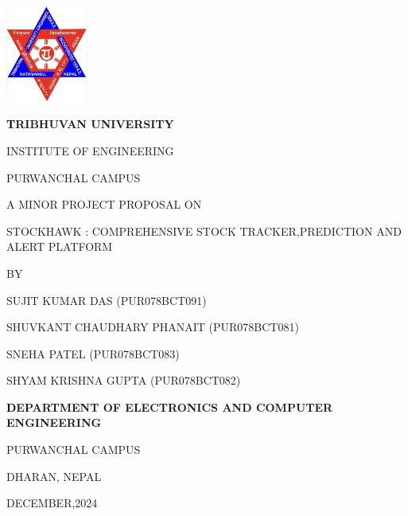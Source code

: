 \begin{titlepage}
    \centering
    
    \includegraphics[width=0.2\textwidth]{Graphics/TULogo.png}\par
    \vspace{1.2cm}
    {\fontsize{14pt}{12pt}\selectfont\bfseries\textcolor{black}
    TRIBHUVAN UNIVERSITY \par INSTITUTE OF ENGINEERING \par PURWANCHAL CAMPUS \par
    \vspace{1.2cm}
    \begin{flushleft}
    
    \end{flushleft}

    \par A MINOR PROJECT PROPOSAL ON
    
    STOCKHAWK : COMPREHENSIVE STOCK TRACKER,PREDICTION AND ALERT PLATFORM\par

    \vspace{1.2cm}
    BY\par SUJIT KUMAR DAS (PUR078BCT091)
      \par SHUVKANT CHAUDHARY PHANAIT (PUR078BCT081)
      \par SNEHA PATEL (PUR078BCT083)
      \par SHYAM KRISHNA GUPTA (PUR078BCT082)
    \par
    \vspace{1.2cm}\par
    }
    {\fontsize{13pt}{12pt}\selectfont\bfseries\textcolor{black}
    DEPARTMENT OF ELECTRONICS AND COMPUTER ENGINEERING\par PURWANCHAL CAMPUS\par DHARAN, NEPAL\par
    \vspace{1.2cm}
    \vspace{1.2cm}
    
     DECEMBER,2024 
    }
\end{titlepage}

